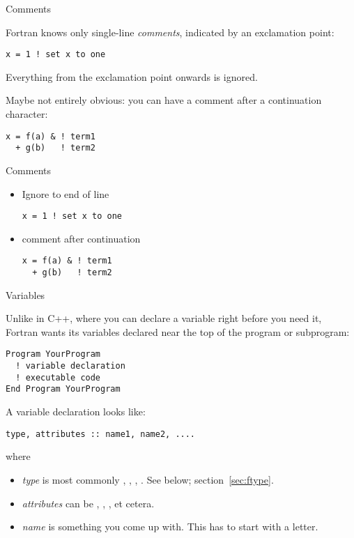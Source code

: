  {Comments}

Fortran knows only single-line
\emph{comments},
indicated by an exclamation point:
\begin{verbatim}
x = 1 ! set x to one
\end{verbatim}
Everything from the exclamation point onwards is ignored.

Maybe not entirely obvious: you can have a comment after a
continuation character:
\begin{verbatim}
x = f(a) & ! term1 
  + g(b)   ! term2
\end{verbatim}

\begin{slide}{Comments}
  \label{sl:fcomment}
  \begin{itemize}
  \item Ignore to end of line
\begin{verbatim}
x = 1 ! set x to one
\end{verbatim}
\item comment after continuation
\begin{verbatim}
x = f(a) & ! term1 
  + g(b)   ! term2
\end{verbatim}
  \end{itemize}
\end{slide}

 {Variables}

Unlike in C++, where you can declare a variable right before you need
it, Fortran wants its variables declared near the top of the program
or subprogram:
\begin{verbatim}
Program YourProgram
  ! variable declaration
  ! executable code
End Program YourProgram
\end{verbatim}
A variable declaration looks like:
\begin{verbatim}
type, attributes :: name1, name2, ....
\end{verbatim}
where
\begin{itemize}
\item \textit{type} is most commonly , , ,
  . See below; section~\ref{sec:ftype}.
\item \textit{attributes} can be , ,
  ,  et cetera.
\item \textit{name} is something you come up with. This has to start
  with a letter.
\end{itemize}

